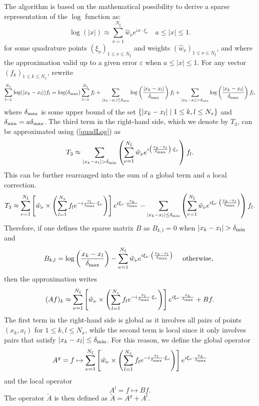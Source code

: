 \documentclass[11pt,a4paper]{article}
\begin{document}
The algorithm is based on the mathematical possibility to derive a sparse representation of the $\log$ function as:
\begin{equation}
\label{quadLog}
\log(|x|) \approx \sum_{\nu = 1}^{N_{\xi}} \hat{w}_{\nu}e^{i x\cdot \xi_{\nu}}\quad a \leq |x| \leq 1.
\end{equation}
for some quadrature points $(\xi_\nu)_{1 \leq \nu \leq N_{\xi}}$ and weights $(\hat{w}_\nu)_{1 \leq \nu \leq N_{\xi}}$, and where the approximation valid up to a given error $\varepsilon$ when $a \leq |x| \leq 1$. For any vector $(f_k)_{1 \leq k \leq N_x}$, rewrite 
\[\sum_{l=1}^{N_x} {\log(|x_k - x_l|) f_l} = \log(\delta_{\max})\sum_{l=1}^{N_x} f_l + \sum_{|x_k - x_l| \leq \delta_{\min}} \log\left(\dfrac{|x_k - x_l|}{\delta_{\max}}\right)f_l + \sum_{|x_k - x_l| > \delta_{\min} }\log\left(\dfrac{|x_k - x_l|}{\delta_{\max}}\right)f_l, \] 
where $\delta_{\max}$ is some upper bound of the set $\left\{|x_k - x_l|\mathrel{}\middle|\mathrel{}1 \leq k,l \leq N_x\right\}$ and $\delta_{\min} = a \delta_{\max}$. The third term in the right-hand side, which we denote by $T_3$, can be approximated using (\ref{quadLog}) as 
\[T_3 \approx \sum_{|x_k - x_l| > \delta_{\min} } \left(\sum_{\nu = 1}^{N_{\xi}} \hat{w}_{\nu}e^{i \left( \frac{x_k - x_l}{\delta_{\max}}\right)\cdot \xi_{\nu}}\right) f_l.\]
This can be further rearranged into the sum of a global term and a local correction.
\[ T_3 \approx  \sum_{\nu = 1}^{N_{\xi}}  \left[ \hat{w}_{\nu} \times \left(\sum_{l=1}^{N_x} f_l e^{-i \frac{x_l}{\delta_{\max}} \cdot \xi_{\nu}} \right) \right] e^{i \xi_{\nu} \cdot\frac{ x_k}{\delta_{\max}}} - \sum_{|x_k - x_l| \leq \delta_{\min}} \left(\sum_{\nu = 1}^{N_\xi} \hat{w}_{\nu} e^{ i \xi_{\nu} \cdot\left(\frac{x_k - x_l}{\delta_{\max}}\right)}\right)  f_l.\]
Therefore, if one defines the sparse matrix $B$ as $B_{k,l} = 0$ when $|x_k - x_l| > \delta_{\min}$ and
\[ B_{k,l} = \log\left(\dfrac{x_k - x_l}{\delta_{\max}}\right) - \sum_{\nu = 1}^{N_\xi} \hat{w}_{\nu} e^{ i \xi_{\nu} \cdot\left(\frac{x_k - x_l}{\delta_{\max}}\right)} \quad \textup{ otherwise, }\]
then the approximation writes 
\[ (Af)_k \approx \sum_{\nu = 1}^{N_{\xi}}  \left[ \hat{w}_{\nu} \times \left(\sum_{l=1}^{N_x} f_l e^{-i \frac{x_l}{\delta_{\max}} \cdot \xi_{\nu}} \right) \right] e^{i \xi_{\nu} \cdot\frac{ x_k}{\delta_{\max}}} + Bf.\]
The first term in the right-hand side is global as it involves all pairs of points $(x_k,x_l)$ for $1 \leq k,l \leq N_x$, while the second term is local since it only involves pairs that satisfy $|x_k-x_l|\leq \delta_{\min}$. For this reason, we define the global operator
\[A^g = f \mapsto \sum_{\nu = 1}^{N_{\xi}}  \left[ \hat{w}_{\nu} \times \left(\sum_{l=1}^{N_x} f_l e^{-i \frac{x_l}{\delta_{\max}} \cdot \xi_{\nu}} \right) \right] e^{i \xi_{\nu} \cdot\frac{ x_k}{\delta_{\max}}}\] 
and the local operator 
\[A^l = f \mapsto Bf.\]
The operator $\tilde{A}$ is then defined as $\tilde{A} = A^g + A^l$. 
\end{document}
